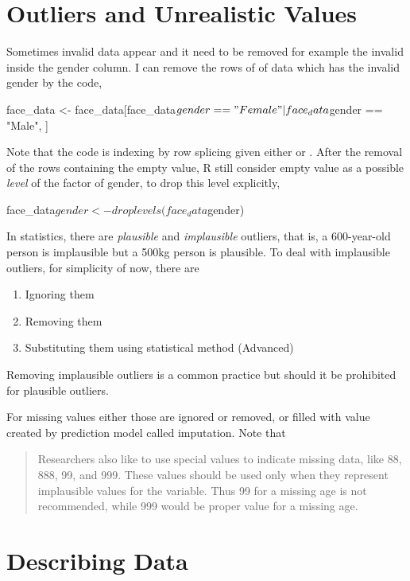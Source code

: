 \section{Outliers and Unrealistic Values}
Sometimes invalid data appear and it need to be removed for example the invalid  inside the gender column. I can remove the rows of of data which has the invalid gender by the code,
\begin{Rblock}
    face_data <- face_data[face_data$gender == "Female" | face_data$gender == "Male", ] 
\end{Rblock}
Note that the code is indexing by row splicing given either  or . After the removal of the rows containing the empty value, R still consider empty value as a possible \emph{level} of the 
factor of gender, to drop this level explicitly,
\begin{Rblock}
    face_data$gender <- droplevels(face_data$gender) 
\end{Rblock}

In statistics, there are \emph{plausible} and \emph{implausible} outliers, that is, a 600-year-old person is implausible but a 500kg person is plausible. To deal with implausible outliers, for simplicity of now, there are
\begin{enumerate}
    \item Ignoring them
    \item Removing them
    \item Substituting them using statistical method (Advanced)
\end{enumerate}
Removing implausible outliers is a common practice but should it be prohibited for plausible outliers. 

For missing values either those are ignored or removed, or filled with value created by prediction model called imputation. Note that
\begin{quote}
    Researchers also like to use special values to indicate missing data, like 88, 888, 99, and 999. These values should be used only when they represent implausible values for the variable. Thus 99 for a missing age
is not recommended, while 999 would be proper value for a missing age. 
\end{quote}

\section{Describing Data}
